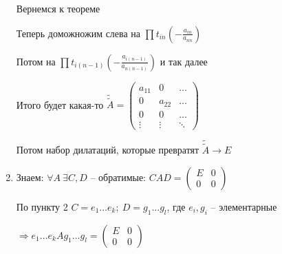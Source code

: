 \documentclass[12pt]{article}
\begin{document}
\begin{enumerate}
    Вернемся к теореме

    Теперь доможножим слева на $\prod t_{in}(- \frac{a_{in}}{a_{nn}})$

    Потом на $\prod t_{i(n - 1)}(- \frac{a_{i(n - 1)}}{a_{n(n - 1)}})$ и так далее

    Итого будет какая-то $\tilde{\tilde{A}} = \begin{pmatrix}
        a_{11} & 0 & \ldots \\
        0 & a_{22} & \ldots \\
        0 & 0 & \ldots \\
        \vdots & \vdots & \ddots
    \end{pmatrix}$

    Потом набор дилатаций, которые превратят $\tilde{\tilde{A}} \to E$

    \item Знаем: $\forall A\ \exists C, D$ -- обратимые: $CAD = \begin{pmatrix}
        E & 0 \\
        0 & 0
    \end{pmatrix}$

    По пункту 2 $C = e_1 \ldots e_k;\ D = g_1 \ldots g_l$, где $e_i, g_i$ -- элементарные

    $\Rightarrow e_1 \ldots e_kAg_1 \ldots g_l = \begin{pmatrix}
        E & 0 \\
        0 & 0
    \end{pmatrix}$
\end{enumerate}
\end{document}
